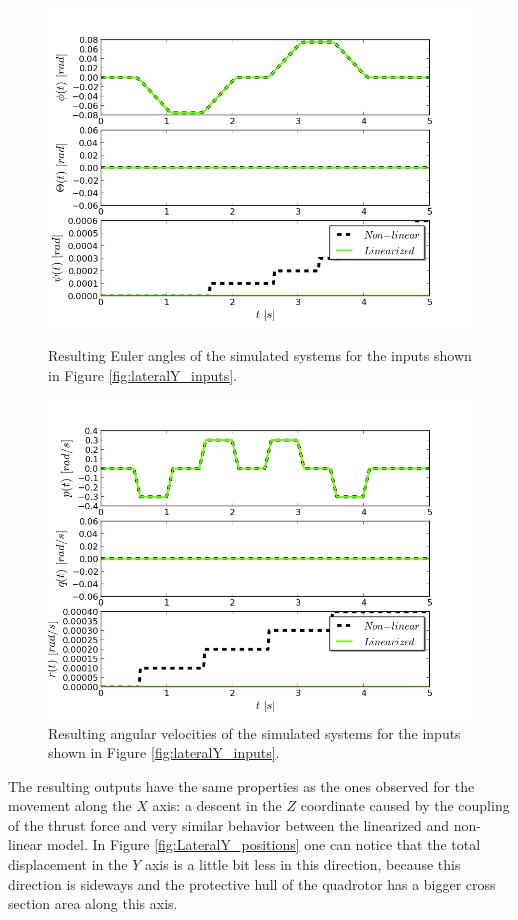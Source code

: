 \begin{figure}[h!]
\centering
\includegraphics[scale=0.7]{Images/Chapter3/Lateral_Y/Euler_Angles.png}
\caption{Resulting Euler angles of the simulated systems for the inputs shown in Figure \ref{fig:lateralY_inputs}.}
\label{fig:LateralY_Euler}

\includegraphics[scale=0.7]{Images/Chapter3/Lateral_Y/Angular_velocities.png}
\caption{Resulting angular velocities of the simulated systems for the inputs shown in Figure \ref{fig:lateralY_inputs}.}
\label{fig:LateralY_angvelocities}
\end{figure}

The resulting outputs have the same properties as the ones observed for the movement along the $X$ axis: a descent in the $Z$ coordinate caused by the coupling of the thrust force and very similar behavior between the linearized and non-linear model. In Figure \ref{fig:LateralY_positions} one can notice that the total displacement in the $Y$ axis is a little bit less in this direction, because this direction is sideways and the protective hull of the quadrotor has a bigger cross section area along this axis. 

